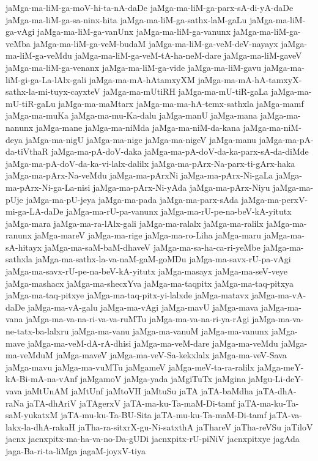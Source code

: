 {jaMga-ma-liM-ga-moV-hi-ta-nA-daDe
jaMga-ma-liM-ga-parx-sA-di-yA-daDe
jaMga-ma-liM-ga-sa-ninx-hita
jaMga-ma-liM-ga-sathx-laM-gaLu
jaMga-ma-liM-ga-vAgi
jaMga-ma-liM-ga-vanUnx
jaMga-ma-liM-ga-vanunx
jaMga-ma-liM-ga-veMba
jaMga-ma-liM-ga-veM-budaM
jaMga-ma-liM-ga-veM-deV-nayayx
jaMga-ma-liM-ga-veMdu
jaMga-ma-liM-ga-veM-tA-ha-neM-dare
jaMga-ma-liM-gaveV
jaMga-ma-liM-ga-venanx
jaMga-ma-liM-ga-vide
jaMga-ma-liM-gavu
jaMga-ma-liM-gi-ga-La-lAlx-gali
jaMga-ma-mA-hAtamxyXM
jaMga-ma-mA-hA-tamxyX-sathx-la-mi-tuyx-cayxteV
jaMga-ma-mUtiRH
jaMga-ma-mU-tiR-gaLa
jaMga-ma-mU-tiR-gaLu
jaMga-ma-maMtarx
jaMga-ma-ma-hA-temx-sathxla
jaMga-mamf
jaMga-ma-muKa
jaMga-ma-mu-Ka-dalu
jaMga-manU
jaMga-mana
jaMga-ma-nanunx
jaMga-mane
jaMga-ma-niMda
jaMga-ma-niM-da-kana
jaMga-ma-niM-deya
jaMga-ma-nigU
jaMga-ma-nige
jaMga-ma-nigeV
jaMga-manu
jaMga-ma-pA-da-tiVthaR
jaMga-ma-pA-doV-daka
jaMga-ma-pA-doV-da-ka-parx-sA-da-diMde
jaMga-ma-pA-doV-da-ka-vi-lalx-dalilx
jaMga-ma-pArx-Na-parx-ti-gArx-haka
jaMga-ma-pArx-Na-veMdu
jaMga-ma-pArxNi
jaMga-ma-pArx-Ni-gaLa
jaMga-ma-pArx-Ni-ga-La-nisi
jaMga-ma-pArx-Ni-yAda
jaMga-ma-pArx-Niyu
jaMga-ma-pUje
jaMga-ma-pU-jeya
jaMga-ma-pada
jaMga-ma-parx-sAda
jaMga-ma-perxV-mi-ga-LA-daDe
jaMga-ma-rU-pa-vanunx
jaMga-ma-rU-pe-na-beV-kA-yitutx
jaMga-mara
jaMga-ma-ra-lAlx-gali
jaMga-ma-ralalx
jaMga-ma-ralilx
jaMga-ma-ranunx
jaMga-mareV
jaMga-ma-rige
jaMga-ma-ro-Liha
jaMga-maru
jaMga-ma-sA-hitayx
jaMga-ma-saM-baM-dhaveV
jaMga-ma-sa-ha-ca-ri-yeMbe
jaMga-ma-sathxla
jaMga-ma-sathx-la-va-naM-gaM-goMDu
jaMga-ma-savx-rU-pa-vAgi
jaMga-ma-savx-rU-pe-na-beV-kA-yitutx
jaMga-masayx
jaMga-ma-seV-veye
jaMga-mashacx
jaMga-ma-shecxYva
jaMga-ma-taqpitx
jaMga-ma-taq-pitxya
jaMga-ma-taq-pitxye
jaMga-ma-taq-pitx-yi-lalxde
jaMga-matavx
jaMga-ma-vA-daDe
jaMga-ma-vA-galu
jaMga-ma-vAgi
jaMga-mavU
jaMga-mava
jaMga-ma-vana
jaMga-ma-va-na-ri-va-va-ruMTu
jaMga-ma-va-na-ri-ya-rAgi
jaMga-ma-va-ne-tatx-ba-lalxru
jaMga-ma-vanu
jaMga-ma-vanuM
jaMga-ma-vanunx
jaMga-mave
jaMga-ma-veM-dA-rA-dhisi
jaMga-ma-veM-dare
jaMga-ma-veMdu
jaMga-ma-veMduM
jaMga-maveV
jaMga-ma-veV-Sa-kekxlalx
jaMga-ma-veV-Sava
jaMga-mavu
jaMga-ma-vuMTu
jaMgameV
jaMga-meV-ta-ra-ralilx
jaMga-meY-kA-Bi-mA-na-vAnf
jaMgamoV
jaMga-yada
jaMgiTuTx
jaMgina
jaMgu-Li-deY-vava
jaMtUnAM
jaMtUnf
jaMtoVH
jaMtuSu
jaTA
jaTA-baMdha
jaTA-dhA-raNa
jaTA-dhAriV
jaTAgerxV
jaTA-ma-ku-Ta-maM-Di-tamf
jaTA-ma-ku-Ta-saM-yukatxM
jaTA-mu-ku-Ta-BU-Sita
jaTA-mu-ku-Ta-maM-Di-tamf
jaTA-va-lakx-la-dhA-rakaH
jaTha-ra-sitxrX-gu-Ni-satxthA
jaThareV
jaTha-reVSu
jaTiloV
jacnx
jacnxpitx-ma-ha-va-no-Da-gUDi
jacnxpitx-rU-piNiV
jacnxpitxye
jagAda
jaga-Ba-ri-ta-liMga
jagaM-joyxV-tiya
}
